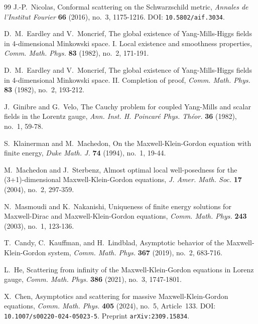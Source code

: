 \documentclass[11pt]{article}
\numberwithin{equation}{section}
\theoremstyle{plain}
\theoremstyle{definition}
\theoremstyle{remark}
\begin{document}
\begin{thebibliography}{99}
J.-P.~Nicolas,
\newblock Conformal scattering on the Schwarzschild metric,
\newblock \emph{Annales de l'Institut Fourier} \textbf{66} (2016), no.~3, 1175-1216.
\newblock DOI: \texttt{10.5802/aif.3034}.

D.~M.~Eardley and V.~Moncrief,
\newblock The global existence of Yang-Mills-Higgs fields in 4-dimensional Minkowski space. I. Local existence and smoothness properties,
\newblock \emph{Comm. Math. Phys.} \textbf{83} (1982), no.~2, 171-191.

D.~M.~Eardley and V.~Moncrief,
\newblock The global existence of Yang-Mills-Higgs fields in 4-dimensional Minkowski space. II. Completion of proof,
\newblock \emph{Comm. Math. Phys.} \textbf{83} (1982), no.~2, 193-212.

J.~Ginibre and G.~Velo,
\newblock The Cauchy problem for coupled Yang-Mills and scalar fields in the Lorentz gauge,
\newblock \emph{Ann. Inst. H. Poincar\'e Phys. Th\'eor.} \textbf{36} (1982), no.~1, 59-78.

S.~Klainerman and M.~Machedon,
\newblock On the Maxwell-Klein-Gordon equation with finite energy,
\newblock \emph{Duke Math. J.} \textbf{74} (1994), no.~1, 19-44.

M.~Machedon and J.~Sterbenz,
\newblock Almost optimal local well-posedness for the (3+1)-dimensional Maxwell-Klein-Gordon equations,
\newblock \emph{J. Amer. Math. Soc.} \textbf{17} (2004), no.~2, 297-359.

N.~Masmoudi and K.~Nakanishi,
\newblock Uniqueness of finite energy solutions for Maxwell-Dirac and Maxwell-Klein-Gordon equations,
\newblock \emph{Comm. Math. Phys.} \textbf{243} (2003), no.~1, 123-136.

T.~Candy, C.~Kauffman, and H.~Lindblad,
\newblock Asymptotic behavior of the Maxwell-Klein-Gordon system,
\newblock \emph{Comm. Math. Phys.} \textbf{367} (2019), no.~2, 683-716.

L.~He,
\newblock Scattering from infinity of the Maxwell-Klein-Gordon equations in Lorenz gauge,
\newblock \emph{Comm. Math. Phys.} \textbf{386} (2021), no.~3, 1747-1801.

X.~Chen,
\newblock Asymptotics and scattering for massive Maxwell-Klein-Gordon equations,
\newblock \emph{Comm. Math. Phys.} \textbf{405} (2024), no.~5, Article~133.
\newblock DOI: \texttt{10.1007/s00220-024-05023-5}. Preprint \texttt{arXiv:2309.15834}.


\end{thebibliography}
\end{document}
